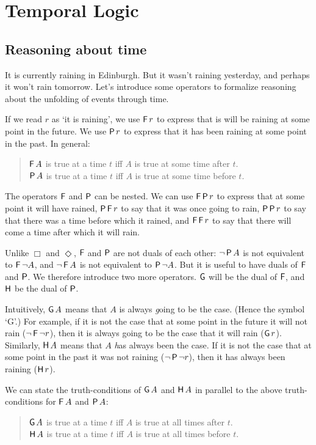 \chapter{Temporal Logic}\label{ch:time}

\section{Reasoning about time}\label{sec:time-intro}

It is currently raining in Edinburgh. But it wasn't raining yesterday, and
perhaps it won't rain tomorrow. Let's introduce some operators to formalize
reasoning about the unfolding of events through time.

If we read $r$ as `it is raining', we use $\operatorname{\mathsf{F}} r$ to express that is will be
raining at some point in the future. We use $\operatorname{\mathsf{P}} r$ to express that it has been
raining at some point in the past. In general:
%
\begin{quote}
  $\operatorname{\mathsf{F}} A$ is true at a time $t$ iff $A$ is true at some time after $t$.\\
  $\operatorname{\mathsf{P}} A$ is true at a time $t$ iff $A$ is true at some time before $t$.
\end{quote}

The operators $\operatorname{\mathsf{F}}$ and $\operatorname{\mathsf{P}}$ can be nested. We can use $\operatorname{\mathsf{F}} \operatorname{\mathsf{P}} r$ to express
that at some point it will have rained, $\operatorname{\mathsf{P}}\operatorname{\mathsf{F}} r$ to say that it was once going
to rain, $\operatorname{\mathsf{P}}\operatorname{\mathsf{P}} r$ to say that there was a time before which it rained, and
$\operatorname{\mathsf{F}}\operatorname{\mathsf{F}} r$ to say that there will come a time after which it will rain.

Unlike $\Box$ and $\Diamond$, $\operatorname{\mathsf{F}}$ and $\operatorname{\mathsf{P}}$ are not duals of each other:
$\neg \operatorname{\mathsf{P}} A$ is not equivalent to $\operatorname{\mathsf{F}} \neg A$, and $\neg \operatorname{\mathsf{F}} A$ is not
equivalent to $\operatorname{\mathsf{P}} \neg A$. But it is useful to have duals of $\operatorname{\mathsf{F}}$ and $\operatorname{\mathsf{P}}$.
We therefore introduce two more operators. $\operatorname{\mathsf{G}}$ will be the dual of $\operatorname{\mathsf{F}}$, and
$\operatorname{\mathsf{H}}$ be the dual of $\operatorname{\mathsf{P}}$.

Intuitively, $\operatorname{\mathsf{G}} A$ means that $A$ is always \emph{g}oing to be the case.
(Hence the symbol `G'.) For example, if it is not the case that at some point in
the future it will not rain ($\neg \operatorname{\mathsf{F}} \neg r$), then it is always going to be
the case that it will rain ($\operatorname{\mathsf{G}} r$). Similarly, $\operatorname{\mathsf{H}} A$ means that $A$
\emph{h}as always been the case. If it is not the case that at some point in the
past it was not raining ($\neg \operatorname{\mathsf{P}} \neg r$), then it has always been raining
($\operatorname{\mathsf{H}} r$).

We can state the truth-conditions of $\operatorname{\mathsf{G}} A$ and $\operatorname{\mathsf{H}} A$ in parallel to the
above truth-conditions for $\operatorname{\mathsf{F}} A$ and $\operatorname{\mathsf{P}} A$:
\begin{quote}
  $\operatorname{\mathsf{G}} A$ is true at a time $t$ iff $A$ is true at all times after $t$.\\
  $\operatorname{\mathsf{H}} A$ is true at a time $t$ iff $A$ is true at all times before $t$.
\end{quote}

